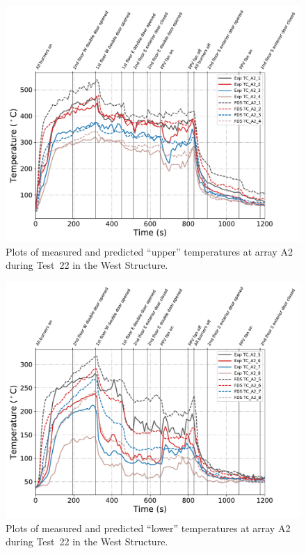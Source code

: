 \begin{figure}[!h]
	\centering
	\includegraphics[width=\columnwidth]{Figures/Plots/Validation/Temperature/Test_22_TC_A2_upper}
	\caption{Plots of measured and predicted ``upper'' temperatures at array A2 during Test~22 in the West Structure.}
	\label{fig:TCA2_upper_data_Test22}
\end{figure}

\begin{figure}[!h]
	\centering
	\includegraphics[width=\columnwidth]{Figures/Plots/Validation/Temperature/Test_22_TC_A2_lower}
	\caption{Plots of measured and predicted ``lower'' temperatures at array A2 during Test~22 in the West Structure.}
	\label{fig:TCA2_lower_data_Test22}
\end{figure}

